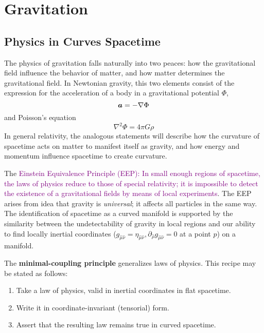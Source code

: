 \section{Gravitation}
\subsection{Physics in Curves Spacetime}
The physics of gravitation falls naturally into two peaces: how the gravitational field influence the behavior of matter, and how matter determines the gravitational field. In Newtonian gravity, this two elements consist of the expression for the acceleration of a body in a gravitational potential $\Phi$,
\begin{equation}\label{4.1}
    \vb*{a}=-\nabla\Phi
\end{equation}
and Poisson's equation
\begin{equation*}
    \nabla^2\Phi=4\pi G\rho
\end{equation*}
In general relativity, the analogous statements will describe how the curvature of spacetime acts on matter to manifest itself as gravity, and how energy and momentum influence spacetime to create curvature.

The \textcolor{purple}{Einstein Equivalence Principle (EEP): In small enough regions of spacetime, the laws of physics reduce to those of special relativity; it is impossible to detect the existence of a gravitational fields by means of local experiments}. The EEP arises from idea that gravity is \textit{universal}; it affects all particles in the same way. The identification of spacetime as a curved manifold is supported by the similarity between the undetectability of gravity in local regions and our ability to find locally inertial coordinates ($g_{\hat{\mu}\hat{\nu}}=\eta_{\hat{\mu}\hat{\nu}}, \partial_{\hat{\rho}}g_{\hat{\mu}\hat{\nu}}=0$ at a point $p$) on a manifold.

The \textbf{minimal-coupling principle} generalizes laws of physics. This recipe may be stated as follows:
\begin{enumerate}
    \item Take a law of physics, valid in inertial coordinates in flat spacetime.
    \item Write it in coordinate-invariant (tensorial) form.
    \item Assert that the resulting law remains true in curved spacetime.
\end{enumerate}

